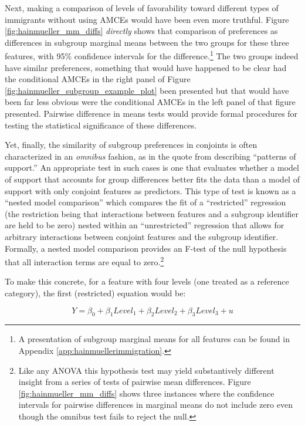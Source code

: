 \documentclass[a4paper,12pt]{article}\usepackage[]{graphicx}\usepackage[]{color}
\begin{document}
Next, making a comparison of levels of favorability toward different types of immigrants without using AMCEs would have been even more truthful. Figure \ref{fig:hainmueller_mm_diffs} \textit{directly} shows that comparison of preferences as differences in subgroup marginal means between the two groups for these three features, with 95\% confidence intervals for the difference.\footnote{A presentation of subgroup marginal means for all features can be found in Appendix \ref{app:hainmuellerimmigration}.} The two groups indeed have similar preferences, something that would have happened to be clear had the conditional AMCEs in the right panel of Figure \ref{fig:hainmueller_subgroup_example_plot} been presented but that would have been far less obvious were the conditional AMCEs in the left panel of that figure presented. Pairwise difference in means tests would provide formal procedures for testing the statistical significance of these differences.

Yet, finally, the similarity of subgroup preferences in conjoints is often characterized in an \textit{omnibus} fashion, as in the quote from \citet{HainmuellerHopkinsYamamoto2014} describing ``patterns of support.'' An appropriate test in such cases is one that evaluates whether a model of support that accounts for group differences better fits the data than a model of support with only conjoint features as predictors. This type of test is known as a ``nested model comparison'' which compares the fit of a ``restricted'' regression (the restriction being that interactions between features and a subgroup identifier are held to be zero) nested within an ``unrestricted'' regression that allows for arbitrary interactions between conjoint features and the subgroup identifier. Formally, a nested model comparison provides an F-test of the null hypothesis that all interaction terms are equal to zero.\footnote{Like any ANOVA this hypothesis test may yield substantively different insight from a series of tests of pairwise mean differences. Figure \ref{fig:hainmueller_mm_diffs} shows three instances where the confidence intervals for pairwise differences in marginal means do not include zero even though the omnibus test fails to reject the null.}

To make this concrete, for a feature with four levels (one treated as a reference category), the first (restricted) equation would be:

\begin{equation}\label{eq:restricted}
Y = \beta_0 + \beta_1 Level_1 + \beta_2 Level_2 + \beta_3 Level_3 + u
\end{equation}
\end{document}
